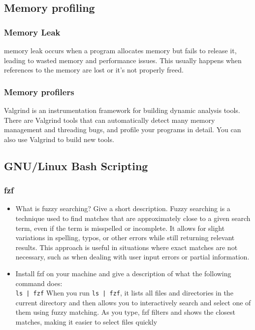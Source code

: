 \documentclass[titlepage]{article}
\begin{document}
\subsection{Memory profiling}
\subsubsection{Memory Leak}
memory leak occurs when a program allocates memory but fails to release it, leading to wasted memory and performance issues. This usually happens when references to the memory are lost or it's not properly freed.

\subsubsection{Memory profilers}
Valgrind is an instrumentation framework for building dynamic analysis tools. There are Valgrind tools that can automatically detect many memory management and threading bugs, and profile your programs in detail. You can also use Valgrind to build new tools.

\subsection{GNU/Linux Bash Scripting}

\subsubsection{fzf}
\begin{itemize}
    \item What is fuzzy searching? Give a short description.
    \newline Fuzzy searching is a technique used to find matches that are approximately close to a given search term, even if the term is misspelled or incomplete. It allows for slight variations in spelling, typos, or other errors while still returning relevant results. This approach is useful in situations where exact matches are not necessary, such as when dealing with user input errors or partial information.
    \item Install fzf on your machine and give a description of what the following command does:\\
        \texttt{ls | fzf}
        \newline
        When you run \texttt{ls | fzf}, it lists all files and directories in the current directory and then allows you to interactively search and select one of them using fuzzy matching. As you type, fzf filters and shows the closest matches, making it easier to select files quickly
\end{itemize}
\end{document}
